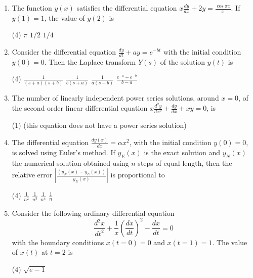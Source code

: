\begin{enumerate}[label=\color{ocre}\textbf{\arabic*.}]
\begin{tasks}
	\end{tasks}
	\item   The function $y(x)$ satisfies the differential equation $x \frac{d y}{d x}+2 y=\frac{\cos \pi x}{x}$. If $y(1)=1$, the value of $y(2)$ is
	{}
	\begin{tasks}(4)
		\task[\textbf{A.}] $\pi$
		\task[\textbf{C.}] $1 / 2$
		\task[\textbf{D.}] $1 / 4$
	\end{tasks}
	\item   Consider the differential equation $\frac{d y}{d t}+a y=e^{-b t}$ with the initial condition $y(0)=0$. Then the Laplace transform $Y(s)$ of the solution $y(t)$ is
	{}
	\begin{tasks}(4)
		\task[\textbf{A.}] $\frac{1}{(s+a)(s+b)}$
		\task[\textbf{B.}] $\frac{1}{b(s+a)}$
		\task[\textbf{C.}] $\frac{1}{a(s+b)}$
		\task[\textbf{D.}] $\frac{e^{-a}-e^{-b}}{b-a}$
	\end{tasks}
	\item The number of linearly independent power series solutions, around $x=0$, of the second order linear differential equation $x \frac{d^{2} y}{d x^{2}}+\frac{d y}{d x}+x y=0$, is
	{}
	\begin{tasks}(1)
		 (this equation does not have a power series solution)
	\end{tasks}
	\item The differential equation $\frac{d y(x)}{d x}=\alpha x^{2}$, with the initial condition $y(0)=0$, is solved using Euler's method. If $y_{E}(x)$ is the exact solution and $y_{N}(x)$ the numerical solution obtained using $n$ steps of equal length, then the relative error $\left|\frac{\left(y_{N}(x)-y_{E}(x)\right)}{y_{E}(x)}\right|$ is proportional to
	{}
	\begin{tasks}(4)
		\task[\textbf{A.}] $\frac{1}{n^{2}}$
		\task[\textbf{B.}] $\frac{1}{n^{3}}$
		\task[\textbf{C.}] $\frac{1}{n^{4}}$
		\task[\textbf{D.}] $\frac{1}{n}$
	\end{tasks}
	\item  Consider the following ordinary differential equation
	$$
	\frac{d^{2} x}{d t^{2}}+\frac{1}{x}\left(\frac{d x}{d t}\right)^{2}-\frac{d x}{d t}=0
	$$
	with the boundary conditions $x(t=0)=0$ and $x(t=1)=1 .$ The value of $x(t)$ at $t=2$ is
	{}
	\begin{tasks}(4)
		\task[\textbf{A.}] $\sqrt{e-1}$

\end{tasks}
\end{enumerate}
